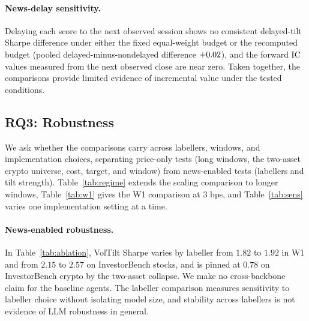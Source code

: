 \paragraph{News-delay sensitivity.}
Delaying each score to the next observed session shows no consistent delayed-tilt Sharpe difference under either the fixed equal-weight budget or the recomputed budget (pooled delayed-minus-nondelayed difference $+0.02$), and the forward IC values measured from the next observed close are near zero. Taken together, the comparisons provide limited evidence of incremental value under the tested conditions.

\subsection{RQ3: Robustness}
\label{sec:rq3}

We ask whether the comparisons carry across labellers, windows, and implementation choices, separating price-only tests (long windows, the two-asset crypto universe, cost, target, and window) from news-enabled tests (labellers and tilt strength). Table~\ref{tab:regime} extends the scaling comparison to longer windows, Table~\ref{tab:w1} gives the W1 comparison at $3$ bps, and Table~\ref{tab:sens} varies one implementation setting at a time.

\paragraph{News-enabled robustness.}
In Table~\ref{tab:ablation}, VolTilt Sharpe varies by labeller from $1.82$ to $1.92$ in W1 and from $2.15$ to $2.57$ on InvestorBench stocks, and is pinned at $0.78$ on InvestorBench crypto by the two-asset collapse. We make no cross-backbone claim for the baseline agents. The labeller comparison measures sensitivity to labeller choice without isolating model size, and stability across labellers is not evidence of LLM robustness in general.


